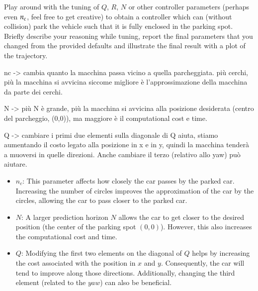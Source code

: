 \documentclass[]{article}
\begin{document}
\begin{assignment}
	Play around with the tuning of $Q$, $R$, $N$ or other controller parameters (perhaps even $n_{\mathrm{c}}$, feel free to get creative)
	to obtain a controller which can (without collision) park the vehicle such that it is fully enclosed in the 
	parking spot. Briefly describe your reasoning while tuning, 
	report the final parameters that you changed from the provided defaults
	and illustrate the final result with a plot of the trajectory.
\end{assignment}
\begin{flushleft}
	nc -> cambia quanto la macchina passa vicino a quella parcheggiata. più cerchi, più la macchina si avvicina siccome migliore è l'approssimazione della macchina da parte dei cerchi.
	
	N -> più N è grande, più la macchina si avvicina alla posizione desiderata (centro del parcheggio, (0,0)), ma maggiore è il computational cost e time.

	Q -> cambiare i primi due elementi sulla diagonale di Q aiuta, stiamo aumentando il costo legato alla posizione in x e in y, quindi la macchina tenderà a muoversi in quelle direzioni. Anche cambiare il terzo (relativo allo yaw) può aiutare.
\end{flushleft}
\begin{itemize}
    \item $n_c$: This parameter affects how closely the car passes by the parked car. Increasing the number of circles improves the approximation of the car by the circles, allowing the car to pass closer to the parked car.
    
    \item $N$: A larger prediction horizon $N$ allows the car to get closer to the desired position (the center of the parking spot $(0,0)$). However, this also increases the computational cost and time.

    \item $Q$: Modifying the first two elements on the diagonal of $Q$ helps by increasing the cost associated with the position in $x$ and $y$. Consequently, the car will tend to improve along those directions. Additionally, changing the third element (related to the $yaw$) can also be beneficial.
\end{itemize}
\end{document}
